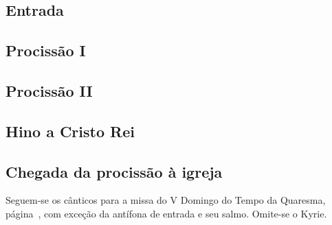 
\subsection{Entrada}\label{subsection:hebdomada-sancta/dominica-in-palmis-de-passione-domini/psalmi-ad-introitum}

\AllowPageBreak

\subsection{Procissão I}\label{subsection:hebdomada-sancta/dominica-in-palmis-de-passione-domini/ad-processionem-1}

\AllowPageFlush

\subsection{Procissão II}\label{subsection:hebdomada-sancta/dominica-in-palmis-de-passione-domini/ad-processionem-2}

\subsection{Hino a Cristo Rei}\label{subsection:hebdomada-sancta/dominica-in-palmis-de-passione-domini/hymnus-ad-christum-regem}

\subsection{Chegada da procissão à igreja}\label{subsection:hebdomada-sancta/dominica-in-palmis-de-passione-domini/ingrediente-processione-in-ecclesiam}

\begin{rubrica}
  Seguem-se os cânticos para a missa do V Domingo do Tempo da Quaresma, página~\pageref{section:tempus-quadragesimae/dominica-5}, com exceção da antífona de entrada e seu salmo. Omite-se o Kyrie.
\end{rubrica}
